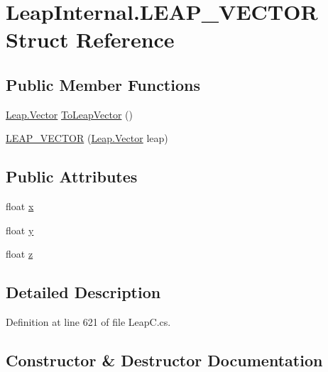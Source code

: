 \hypertarget{struct_leap_internal_1_1_l_e_a_p___v_e_c_t_o_r}{}\section{Leap\+Internal.\+L\+E\+A\+P\+\_\+\+V\+E\+C\+T\+OR Struct Reference}
\label{struct_leap_internal_1_1_l_e_a_p___v_e_c_t_o_r}
\subsection*{Public Member Functions}
\begin{DoxyCompactItemize}
\item 
\mbox{\hyperlink{struct_leap_1_1_vector}{Leap.\+Vector}} \mbox{\hyperlink{struct_leap_internal_1_1_l_e_a_p___v_e_c_t_o_r_a6c8581a40c7fcc33f66e6e0732eb097a}{To\+Leap\+Vector}} ()
\item 
\mbox{\hyperlink{struct_leap_internal_1_1_l_e_a_p___v_e_c_t_o_r_aec7dbc338552237d9a2fe404effa18c9}{L\+E\+A\+P\+\_\+\+V\+E\+C\+T\+OR}} (\mbox{\hyperlink{struct_leap_1_1_vector}{Leap.\+Vector}} leap)
\end{DoxyCompactItemize}
\subsection*{Public Attributes}
\begin{DoxyCompactItemize}
\item 
float \mbox{\hyperlink{struct_leap_internal_1_1_l_e_a_p___v_e_c_t_o_r_a5a641abc075b71fc0a9f3bed31a2d0f0}{x}}
\item 
float \mbox{\hyperlink{struct_leap_internal_1_1_l_e_a_p___v_e_c_t_o_r_a590c426ffd4e8ade9475dba1e85433dd}{y}}
\item 
float \mbox{\hyperlink{struct_leap_internal_1_1_l_e_a_p___v_e_c_t_o_r_af1fc4bf9c27138af9d077175709c68ef}{z}}
\end{DoxyCompactItemize}


\subsection{Detailed Description}


Definition at line 621 of file Leap\+C.\+cs.



\subsection{Constructor \& Destructor Documentation}
\mbox{\label{struct_leap_internal_1_1_l_e_a_p___v_e_c_t_o_r_aec7dbc338552237d9a2fe404effa18c9}} 
